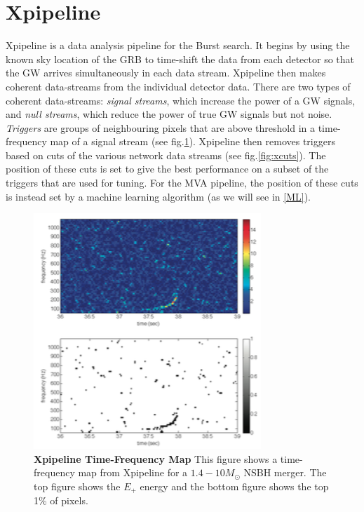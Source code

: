 \documentclass[11pt]{cuthesis}
\begin{document}


\section{\label{xtriggers}Xpipeline}
Xpipeline is a data analysis pipeline for the Burst search. It begins by using the known sky location of the GRB to time-shift the data from each detector so that the GW arrives simultaneously in each data stream. Xpipeline then makes coherent data-streams from the individual detector data. There are two types of coherent data-streams: \textit{signal streams}, which increase the power of a GW signals, and \textit{null streams}, which reduce the power of true GW signals but not noise. \textit{Triggers} are groups of neighbouring pixels that are above threshold in a time-frequency map of a signal stream (see fig.\ref{fig:tfmap}). Xpipeline then removes triggers based on cuts of the various network data streams (see fig.\ref{fig:xcuts}). The position of these cuts is set to give the best performance on a subset of the triggers that are used for tuning. For the MVA pipeline, the position of these cuts is instead set by a machine learning algorithm (as we will see in \ref{ML}).

\begin{figure} %
\begin{center}
\includegraphics[width=0.8\linewidth]{xpipelineTFmap.png}
\end{center}
\caption{\textbf{Xpipeline Time-Frequency Map} This figure shows a time-frequency map from Xpipeline for a $1.4-10M_\odot$ NSBH merger. The top figure shows the $E_+$ energy and the bottom figure shows the top 1\% of pixels. } %
\label{fig:tfmap}
\end{figure}
\end{document}
